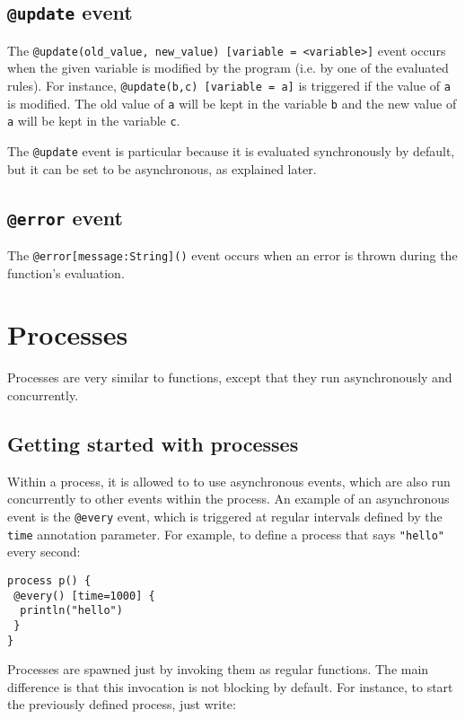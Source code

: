 \documentclass[11pt]{report}
\begin{document}
\subsection{\texttt{@update} event}

The \texttt{@update(old\_value, new\_value) [variable = <variable>]} event occurs when the given variable is modified by the program (i.e. by one of the evaluated rules). For instance, \texttt{@update(b,c) [variable = a]} is triggered if the value of \texttt{a} is modified. The old value of \texttt{a} will be kept in the variable \texttt{b} and the new value of \texttt{a} will be kept in the variable \texttt{c}.

The \texttt{@update} event is particular because it is evaluated synchronously by default, but it can be set to be asynchronous, as explained later.

\subsection{\texttt{@error} event}

The \texttt{@error[message:String]()} event occurs when an error is thrown during the function's evaluation.

\section{Processes\label{sec:processes}}

Processes are very similar to functions, except that they run asynchronously and concurrently. 

\subsection{Getting started with processes}

Within a process, it is allowed to to use asynchronous events, which are also run concurrently to other events within the process. An example of an asynchronous event is the \texttt{@every} event, which is triggered at regular intervals defined by the \texttt{time} annotation parameter. For example, to define a process that says \texttt{"hello"} every second:

\begin{lstlisting}
process p() {
 @every() [time=1000] {
  println("hello")
 }
}
\end{lstlisting}

Processes are spawned just by invoking them as regular functions. The main difference is that this invocation is not blocking by default. For instance, to start the previously defined process, just write:
\end{document}

